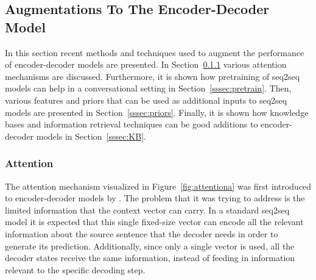 \documentclass[12pt]{article}
\begin{document}
\subsection{Augmentations To The Encoder-Decoder Model} \label{ssec:32}
In this section recent methods and techniques used to augment the performance of encoder-decoder models are presented. In Section~\ref{sssec:attention} various attention mechanisms are discussed. Furthermore, it is shown how pretraining of seq2seq models can help in a conversational setting in Section~\ref{sssec:pretrain}. Then, various features and priors that can be used as additional inputs to seq2seq models are presented in Section~\ref{sssec:priors}. Finally, it is shown how knowledge bases and information retrieval techniques can be good additions to encoder-decoder models in Section~\ref{sssec:KB}.

\subsubsection{Attention} \label{sssec:attention}
The attention mechanism visualized in Figure~\ref{fig:attentiona} was first introduced to encoder-decoder models by \cite{Bahdanau:2014}. The problem that it was trying to address is the limited information that the context vector can carry. In a standard seq2seq model it is expected that this single fixed-size vector can encode all the relevant information about the source sentence that the decoder needs in order to generate its prediction. Additionally, since only a single vector is used, all the decoder states receive the same information, instead of feeding in information relevant to the specific decoding step. 
\end{document}

